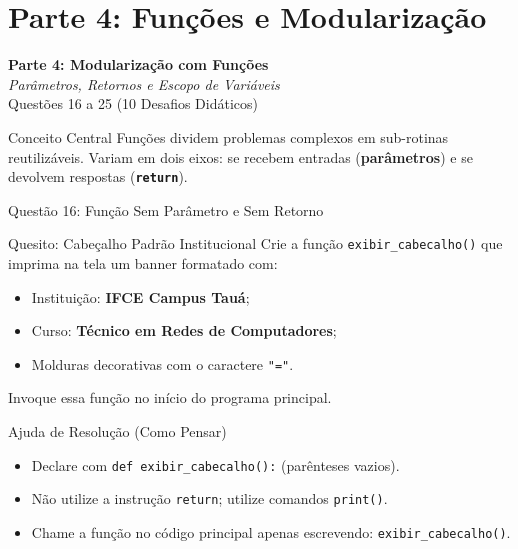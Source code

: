 \section{Parte 4: Funções e Modularização}

\begin{frame}
    \begin{center}
        \LARGE \textbf{Parte 4: Modularização com Funções}\\
        \vspace{0.3cm}
        \normalsize \textit{Parâmetros, Retornos e Escopo de Variáveis}\\
        \vspace{0.4cm}
        \small Questões 16 a 25 (10 Desafios Didáticos)
    \end{center}
    \vspace{0.3cm}
    \begin{alertblock}{Conceito Central}
        Funções dividem problemas complexos em sub-rotinas reutilizáveis. Variam em dois eixos: se recebem entradas (\textbf{parâmetros}) e se devolvem respostas (\textbf{\texttt{return}}).
    \end{alertblock}
\end{frame}

\begin{frame}{Questão 16: Função Sem Parâmetro e Sem Retorno}
    \begin{block}{Quesito: Cabeçalho Padrão Institucional}
        Crie a função \texttt{exibir\_cabecalho()} que imprima na tela um banner formatado com:
        \begin{itemize}
            \item Instituição: \textbf{IFCE Campus Tauá};
            \item Curso: \textbf{Técnico em Redes de Computadores};
            \item Molduras decorativas com o caractere \texttt{"="}.
        \end{itemize}
        Invoque essa função no início do programa principal.
    \end{block}

    \begin{exampleblock}{Ajuda de Resolução (Como Pensar)}
        \begin{itemize}
            \item Declare com \texttt{def exibir\_cabecalho():} (parênteses vazios).
            \item Não utilize a instrução \texttt{return}; utilize comandos \texttt{print()}.
            \item Chame a função no código principal apenas escrevendo: \texttt{exibir\_cabecalho()}.
        \end{itemize}
    \end{exampleblock}
\end{frame}

